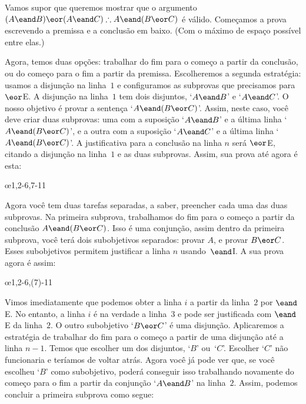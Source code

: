 Vamos supor que queremos mostrar que o argumento $(A \eand B) \eor (A \eand C) \therefore A \eand (B \eor C)$ é válido. Começamos a prova escrevendo a premissa e a conclusão em baixo. (Com o máximo de espaço possível entre elas.) 
\begin{fitchproof}
\ellipsesline
\end{fitchproof}
Agora, temos duas opções: trabalhar do fim para o começo a partir da conclusão, ou do começo para o fim a partir da premissa. Escolheremos a segunda estratégia: usamos a disjunção na linha~$1$ e configuramos as subprovas que precisamos para  $\eor$E. A disjunção na linha~$1$ tem dois disjuntos, `$A \eand B$' e `$A \eand C$'. 
O nosso objetivo é provar a sentença `$A \eand (B \eor C)$'. Assim, neste caso, você  deve criar duas subprovas:  uma com a suposição `$A \eand B$' e a última linha `$A \eand (B \eor C)$', e a  outra com a suposição `$A \eand C$' e a última linha `$A \eand (B \eor C)$'. A justificativa para a conclusão na linha $n$  será  $\eor$E,  citando a disjunção na linha~$1$ e as duas subprovas. Assim, sua prova até agora é esta:
 

\begin{fitchproof}
	\open
	\ellipsesline 
	\close
	\open
	\ellipsesline
	\close
	\oe{1,2-6,7-11}
\end{fitchproof}
Agora você tem duas tarefas separadas, a saber,  preencher cada uma das duas subprovas. Na primeira subprova, trabalhamos do fim para o começo a partir da conclusão $A \eand (B \eor C)$. Isso é uma conjunção, assim dentro da primeira subprova, você terá dois subobjetivos separados: provar $A$, e provar $B \eor C$. Esses subobjetivos permitem justificar a linha $n$ usando~$\eand$I. A sua prova agora é assim:
 

\begin{fitchproof}
	\open
	\ellipsesline
	\ellipsesline
	\close
	\open
	\ellipsesline
	\close
	\oe{1,2-6,(7)-11}
\end{fitchproof}
Vimos imediatamente que podemos obter a linha $i$ a partir da linha~$2$ por $\eand$E. No entanto, a linha $i$ é na verdade a linha~$3$ e pode ser justificada com $\eand$E  da linha~$2$. O outro subobjetivo `$B \eor C$' é uma disjunção.
Aplicaremos a estratégia de trabalhar do fim para o começo a partir de uma disjunção até a linha $n-1$. Temos que escolher um dos disjuntos, `$B$' ou~`$C$'. 
Escolher `$C$' não funcionaria e teríamos de voltar atrás. Agora você já pode ver que, se você escolheu `$B$' como subobjetivo, poderá conseguir isso trabalhando novamente do começo para o fim a partir da conjunção `$A \eand B$' na linha~$2$. Assim, podemos concluir a primeira subprova como segue:
 


